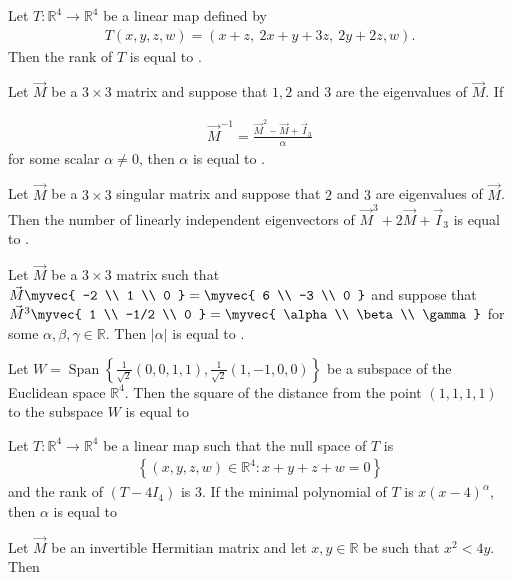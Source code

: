 \item Let $T: \mathbb{R}^4 \to \mathbb{R}^4$ be a linear map defined by  
\begin{align*}
T(x, y, z, w) = (x + z,\ 2x + y + 3z,\ 2y + 2z, w).
\end{align*}
Then the rank of $T$ is equal to \underline{\hspace{2cm}}.
\hfill{} 
\item Let $\vec{M}$ be a $3 \times 3$ matrix and suppose that $1, 2$ and $3$ are the eigenvalues of $\vec{M}$. 
If 

\hfill{} 
\begin{align*}
\vec{M}^{-1} = \frac{\vec{M}^2 - \vec{M} + \vec{I}_3}{\alpha}
\end{align*}
for some scalar $\alpha \neq 0$, then $\alpha$ is equal to \underline{\hspace{2cm}}.
\item Let $\vec{M}$ be a $3 \times 3$ singular matrix and suppose that $2$ and $3$ are eigenvalues of $\vec{M}$. Then the number of linearly independent eigenvectors of $\vec{M}^3 + 2\vec{M} + \vec{I}_3$ is equal to \underline{\hspace{2cm}}. \hfill{} 
\item Let $\vec{M}$ be a $3 \times 3$ matrix such that $\vec{M} \myvec{ -2 \\ 1 \\ 0 } = \myvec{ 6 \\ -3 \\ 0 }$ and suppose that $\vec{M}^3 \myvec{ 1 \\ -1/2 \\ 0 } = \myvec{ \alpha \\ \beta \\ \gamma }$ for some $\alpha, \beta, \gamma \in \mathbb{R}$. Then $|\alpha|$ is equal to \underline{\hspace{2cm}}.
\hfill{} 
\item Let $W = \operatorname{Span} \left\{ \frac{1}{\sqrt{2}} (0,0,1,1), \frac{1}{\sqrt{2}} (1,-1,0,0) \right\}$ be a subspace of the Euclidean space $\mathbb{R}^4$. Then the square of the distance from the point $(1,1,1,1)$ to the subspace $W$ is equal to \underline{\hspace{2cm}}
\hfill{} 
\item Let $T : \mathbb{R}^4 \to \mathbb{R}^4$ be a linear map such that the null space of $T$ is
\begin{align*}
\left\{ (x, y, z, w) \in \mathbb{R}^4 : x+y+z+w = 0 \right\}
\end{align*}
and the rank of $(T - 4I_4)$ is $3$. If the minimal polynomial of $T$ is $x(x - 4)^\alpha$, then $\alpha$ is equal to \underline{\hspace{2cm}}
\hfill{} 
\item Let $\vec{M}$ be an invertible Hermitian matrix and let $x, y \in \mathbb{R}$ be such that $x^2 < 4y$. Then

